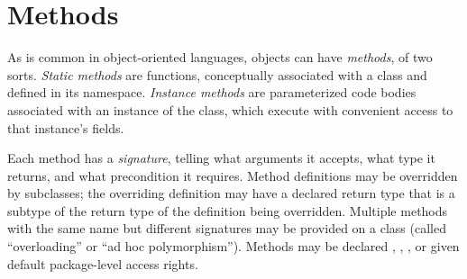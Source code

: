 \section{Methods}

As is common in object-oriented languages, objects can have {\em methods}, of
two sorts.  {\em Static methods} are functions, conceptually associated with a
class and defined in its namespace.  {\em Instance methods} are parameterized
code bodies associated with an instance of the class, which execute with
convenient access to that instance's fields. 

Each method has a {\em signature}, telling what arguments it accepts, what
type it returns, and what precondition it requires. Method definitions may be
overridden by subclasses; the overriding definition may have a declared return
type that is a subtype of the return type of the definition being overridden.
Multiple methods with the same name but different signatures may be provided
on a class (called ``overloading'' or ``ad hoc polymorphism''). Methods may be
declared , , , or given default package-level access
rights.


